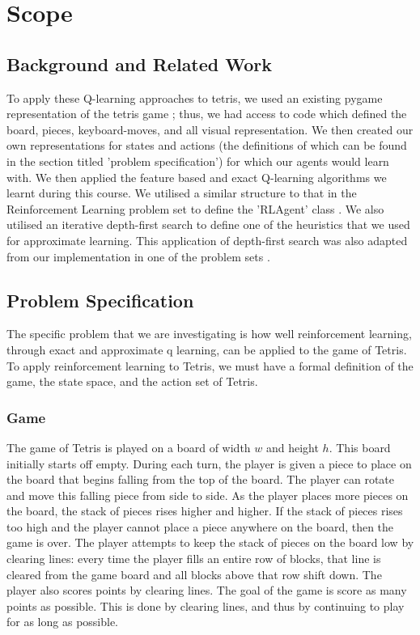 \documentclass[10pt]{article}
\begin{document}
\section{Scope}

\subsection{Background and Related Work}
To apply these Q-learning approaches to tetris, we used an existing pygame representation of the tetris game \cite{WEBSITE:1}; thus, we had access to code which defined the board, pieces, keyboard-moves, and all visual representation. We then created our own representations for states and actions (the definitions of which can be found in the section titled 'problem specification') for which our agents would learn with. We then applied the feature based and exact Q-learning algorithms we learnt during this course. We utilised a similar structure to that in the Reinforcement Learning problem set to define the 'RLAgent' class \cite{CODE:1}. We also utilised an iterative depth-first search to define one of the heuristics that we used for approximate learning. This application of depth-first search was also adapted from our implementation in one of the problem sets \cite{CODE:2}.

\subsection{Problem Specification}
The specific problem that we are investigating is how well reinforcement learning, through exact and approximate q learning, can be applied to the game of Tetris. To apply reinforcement learning to Tetris, we must have a formal definition of the game, the state space, and the action set of Tetris.

\subsubsection{Game}
The game of Tetris is played on a board of width $w$ and height $h$. This board initially starts off empty. During each turn, the player is given a piece to place on the board that begins falling from the top of the board. The player can rotate and move this falling piece from side to side. As the player places more pieces on the board, the stack of pieces rises higher and higher. If the stack of pieces rises too high and the player cannot place a piece anywhere on the board, then the game is over. The player attempts to keep the stack of pieces on the board low by clearing lines: every time the player fills an entire row of blocks, that line is cleared from the game board and all blocks above that row shift down. The player also scores points by clearing lines. The goal of the game is score as many points as possible. This is done by clearing lines, and thus by continuing to play for as long as possible.
\end{document}
